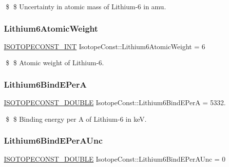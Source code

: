 \$ \$ Uncertainty in atomic mass of Lithium-\/6 in amu. \mbox{\label{group___isotope_const-_lithium-_li6_ga53c4511cc442e34712ed3d78559eec34}} 
\subsubsection{\texorpdfstring{Lithium6\+Atomic\+Weight}{Lithium6AtomicWeight}}
{\footnotesize\ttfamily \mbox{\hyperlink{group___isotope_const-_macros_ga5f18360b3e99483a35c32d789e62621c}{I\+S\+O\+T\+O\+P\+E\+C\+O\+N\+S\+T\+\_\+\+I\+NT}} Isotope\+Const\+::\+Lithium6\+Atomic\+Weight = 6}

\$ \$ Atomic weight of Lithium-\/6. \mbox{\label{group___isotope_const-_lithium-_li6_ga7033ea0d46dc1432e32cc0e23eb98da4}} 
\subsubsection{\texorpdfstring{Lithium6\+Bind\+E\+PerA}{Lithium6BindEPerA}}
{\footnotesize\ttfamily \mbox{\hyperlink{group___isotope_const-_macros_ga8f45a7272ce02c0b4c65c44636ed719a}{I\+S\+O\+T\+O\+P\+E\+C\+O\+N\+S\+T\+\_\+\+D\+O\+U\+B\+LE}} Isotope\+Const\+::\+Lithium6\+Bind\+E\+PerA = 5332.}

\$ \$ Binding energy per A of Lithium-\/6 in keV. \mbox{\label{group___isotope_const-_lithium-_li6_gad9cc80e8a6f4c64c725c4666e4847179}} 
\subsubsection{\texorpdfstring{Lithium6\+Bind\+E\+Per\+A\+Unc}{Lithium6BindEPerAUnc}}
{\footnotesize\ttfamily \mbox{\hyperlink{group___isotope_const-_macros_ga8f45a7272ce02c0b4c65c44636ed719a}{I\+S\+O\+T\+O\+P\+E\+C\+O\+N\+S\+T\+\_\+\+D\+O\+U\+B\+LE}} Isotope\+Const\+::\+Lithium6\+Bind\+E\+Per\+A\+Unc = 0}

